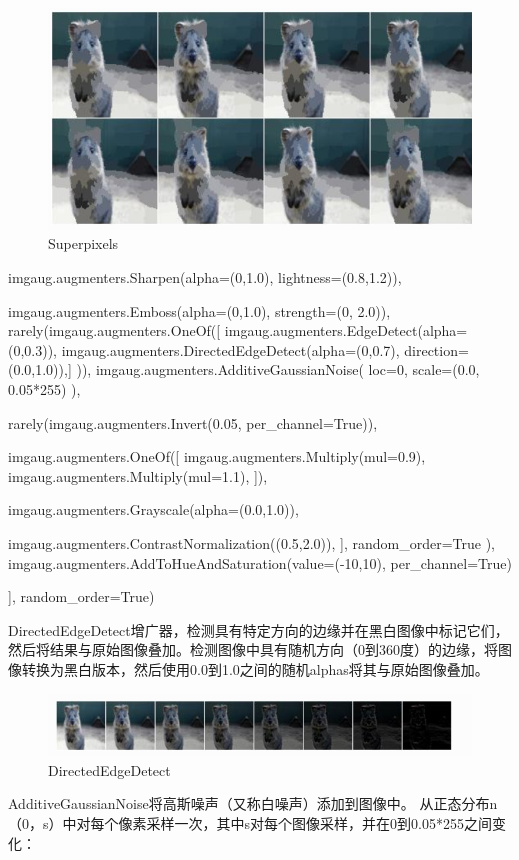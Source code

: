 \documentclass[12pt]{report}
\begin{document}
\begin{figure}[h]
 
  \includegraphics[width=.8\textwidth]{Super.png} %
  \caption{Superpixels} %
  \label{img2} %
\end{figure}
\begin{python}

        imgaug.augmenters.Sharpen(alpha=(0,1.0), lightness=(0.8,1.2)),

        imgaug.augmenters.Emboss(alpha=(0,1.0), strength=(0, 2.0)),
    rarely(imgaug.augmenters.OneOf([
        imgaug.augmenters.EdgeDetect(alpha=(0,0.3)),
        imgaug.augmenters.DirectedEdgeDetect(alpha=(0,0.7), direction=(0.0,1.0)),]
    )),
        imgaug.augmenters.AdditiveGaussianNoise(
            loc=0, scale=(0.0, 0.05*255)
        ),
        
        rarely(imgaug.augmenters.Invert(0.05, per_channel=True)),

    

        imgaug.augmenters.OneOf([
            imgaug.augmenters.Multiply(mul=0.9),
            imgaug.augmenters.Multiply(mul=1.1),
        ]),

        imgaug.augmenters.Grayscale(alpha=(0.0,1.0)),

        imgaug.augmenters.ContrastNormalization((0.5,2.0)),
    ],
    random_order=True
),
    imgaug.augmenters.AddToHueAndSaturation(value=(-10,10), per_channel=True)

], random_order=True)
\end{python}

DirectedEdgeDetect增广器，检测具有特定方向的边缘并在黑白图像中标记它们，然后将结果与原始图像叠加。检测图像中具有随机方向（0到360度）的边缘，将图像转换为黑白版本，然后使用0.0到1.0之间的随机alphas将其与原始图像叠加。\par
\begin{figure}[h]


 
  \includegraphics[width=.8\textwidth]{D.png} %
  \caption{DirectedEdgeDetect} %
  \label{DirectedEdgeDetect} %
\end{figure}
AdditiveGaussianNoise将高斯噪声（又称白噪声）添加到图像中。
从正态分布n（0，s）中对每个像素采样一次，其中s对每个图像采样，并在0到0.05*255之间变化：
\end{document}
